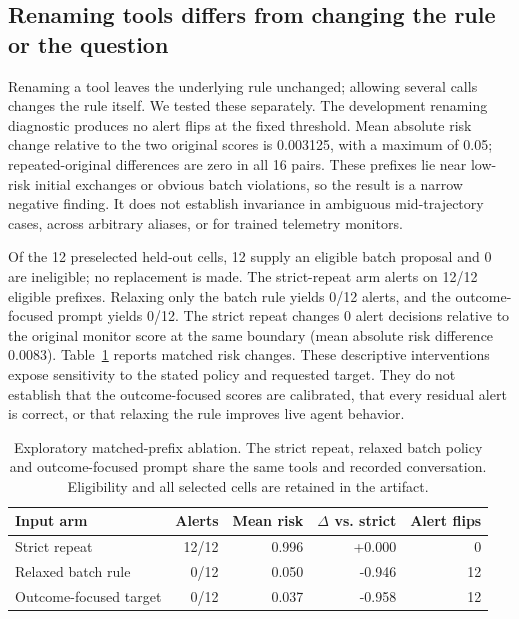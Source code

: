 \subsection{Renaming tools differs from changing the rule or the question}
Renaming a tool leaves the underlying rule unchanged; allowing several calls changes the rule itself. We tested these separately. The development renaming diagnostic produces no alert flips at the fixed threshold. Mean absolute risk change relative to the two original scores is 0.003125, with a maximum of 0.05; repeated-original differences are zero in all 16 pairs. These prefixes lie near low-risk initial exchanges or obvious batch violations, so the result is a narrow negative finding. It does not establish invariance in ambiguous mid-trajectory cases, across arbitrary aliases, or for trained telemetry monitors.

Of the 12 preselected held-out cells, 12 supply an eligible batch proposal and 0 are ineligible; no replacement is made. The strict-repeat arm alerts on 12/12 eligible prefixes. Relaxing only the batch rule yields 0/12 alerts, and the outcome-focused prompt yields 0/12. The strict repeat changes 0 alert decisions relative to the original monitor score at the same boundary (mean absolute risk difference 0.0083). Table~\ref{tab:ablation} reports matched risk changes. These descriptive interventions expose sensitivity to the stated policy and requested target. They do not establish that the outcome-focused scores are calibrated, that every residual alert is correct, or that relaxing the rule improves live agent behavior.

\begin{table}[t]
\centering\small
\caption{Exploratory matched-prefix ablation. The strict repeat, relaxed batch policy and outcome-focused prompt share the same tools and recorded conversation. Eligibility and all selected cells are retained in the artifact.}
\label{tab:ablation}
\begin{tabular}{lrrrr}
\toprule
Input arm & Alerts & Mean risk & $\Delta$ vs. strict & Alert flips\\
\midrule
Strict repeat & 12/12 & 0.996 & +0.000 & 0\\
Relaxed batch rule & 0/12 & 0.050 & -0.946 & 12\\
Outcome-focused target & 0/12 & 0.037 & -0.958 & 12\\
\bottomrule
\end{tabular}


\end{table}

